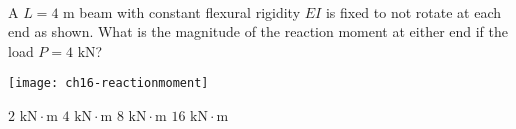 \variant
\\
\begin{minipage}[t]{3in}
A $L=4\text{ m}$ beam with constant flexural rigidity $EI$ is fixed to not rotate at each end as shown. What is the magnitude of the reaction moment at either end if the load $P = 4\text{ kN}$?
\end{minipage}
\quad
\begin{minipage}[t]{3in}
\vspace{-12pt}
\texttt{[image: ch16-reactionmoment]}
\end{minipage}
\vspace{-24pt}
\begin{answers}
\correctanswer $2\text{ kN}\cdot\text{m}$
\answer $4\text{ kN}\cdot\text{m}$
\answer $8\text{ kN}\cdot\text{m}$
\answer $16\text{ kN}\cdot\text{m}$
\end{answers}
